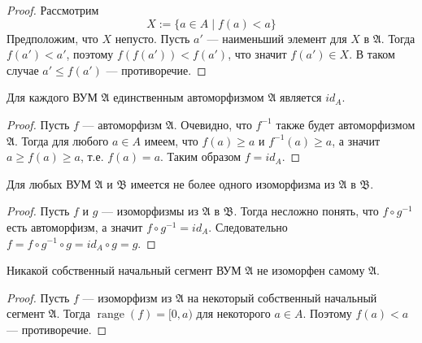 \documentclass[12pt,a4paper]{article}
\DeclareMathOperator{\range}{range}
\begin{document}
    \begin{proof}
        Рассмотрим
        \[X := \{a \in A \mid f(a) < a\}\]
        Предположим, что $X$ непусто. Пусть $a'$ --- наименьший элемент для $X$ в $\mathfrak{A}$. Тогда $f(a') < a'$, поэтому $f(f(a')) < f(a')$, что значит $f(a') \in X$. В таком случае $a' \leqslant f(a')$ --- противоречие.
    \end{proof}

    \begin{corollary}
        Для каждого ВУМ $\mathfrak{A}$ единственным автоморфизмом $\mathfrak{A}$ является $id_A$.
    \end{corollary}

    \begin{proof}
        Пусть $f$ --- автоморфизм $\mathfrak{A}$. Очевидно, что $f^{-1}$ также будет автоморфизмом $\mathfrak{A}$. Тогда для любого $a \in A$ имеем, что $f(a) \geqslant a$ и $f^{-1}(a) \geqslant a$, а значит $a \geqslant f(a) \geqslant a$, т.е. $f(a) = a$. Таким образом $f = id_A$.
    \end{proof}

    \begin{corollary}
        Для любых ВУМ $\mathfrak{A}$ и $\mathfrak{B}$ имеется не более одного изоморфизма из $\mathfrak{A}$ в $\mathfrak{B}$.
    \end{corollary}

    \begin{proof}
        Пусть $f$ и $g$ --- изоморфизмы из $\mathfrak{A}$ в $\mathfrak{B}$. Тогда несложно понять, что $f \circ g^{-1}$ есть автоморфизм, а значит $f \circ g^{-1} = id_A$. Следовательно $f = f \circ g^{-1} \circ g = id_A \circ g = g$.
    \end{proof}

    \begin{lemma}
        Никакой собственный начальный сегмент ВУМ $\mathfrak{A}$ не изоморфен самому $\mathfrak{A}$.
    \end{lemma}

    \begin{proof}
        Пусть $f$ --- изоморфизм из $\mathfrak{A}$ на некоторый собственный начальный сегмент $\mathfrak{A}$. Тогда $\range(f) = [0, a)$ для некоторого $a \in A$. Поэтому $f(a) < a$ --- противоречие.
    \end{proof}
\end{document}
